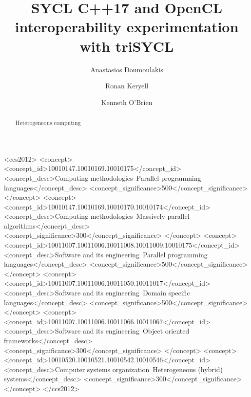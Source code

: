 \documentclass[sigplan, review]{acmart}
\begin{document}
\title{SYCL C++17 and OpenCL interoperability experimentation with
  triSYCL}

\author{Anastasios Doumoulakis}

\author{Ronan Keryell}

\author{Kenneth O'Brien}



\begin{abstract}
Heterogeneous computing 
\end{abstract}

%
\begin{CCSXML}
<ccs2012>
<concept>
<concept_id>10010147.10010169.10010175</concept_id>
<concept_desc>Computing methodologies~Parallel programming languages</concept_desc>
<concept_significance>500</concept_significance>
</concept>
<concept>
<concept_id>10010147.10010169.10010170.10010174</concept_id>
<concept_desc>Computing methodologies~Massively parallel algorithms</concept_desc>
<concept_significance>300</concept_significance>
</concept>
<concept>
<concept_id>10011007.10011006.10011008.10011009.10010175</concept_id>
<concept_desc>Software and its engineering~Parallel programming languages</concept_desc>
<concept_significance>500</concept_significance>
</concept>
<concept>
<concept_id>10011007.10011006.10011050.10011017</concept_id>
<concept_desc>Software and its engineering~Domain specific languages</concept_desc>
<concept_significance>500</concept_significance>
</concept>
<concept>
<concept_id>10011007.10011006.10011066.10011067</concept_id>
<concept_desc>Software and its engineering~Object oriented frameworks</concept_desc>
<concept_significance>300</concept_significance>
</concept>
<concept>
<concept_id>10010520.10010521.10010542.10010546</concept_id>
<concept_desc>Computer systems organization~Heterogeneous (hybrid) systems</concept_desc>
<concept_significance>300</concept_significance>
</concept>
</ccs2012>
\end{CCSXML}

\end{document}
